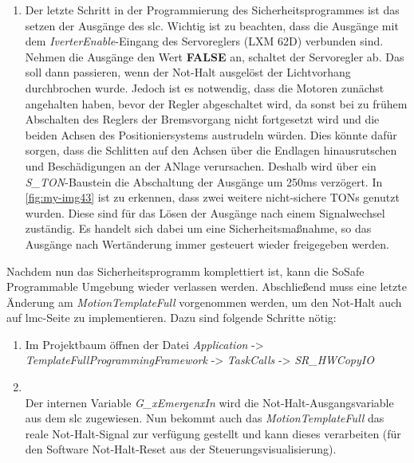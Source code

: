 \documentclass[../../../Bachelorarbeit.tex]{subfiles}
\begin{document}
\begin{enumerate}
    \item Der letzte Schritt in der Programmierung des Sicherheitsprogrammes ist das setzen der Ausgänge des \acs{slc}. Wichtig ist zu beachten, dass die Ausgänge mit dem \textit{IverterEnable}-Eingang des Servoreglers (LXM 62D) verbunden sind. Nehmen die Ausgänge den Wert \textbf{FALSE} an, schaltet der Servoregler ab. Das soll dann passieren, wenn der Not-Halt ausgelöst \bzw der Lichtvorhang durchbrochen wurde. Jedoch ist es notwendig, dass die Motoren zunächst angehalten haben, bevor der Regler abgeschaltet wird, da sonst bei zu frühem Abschalten des Reglers der Bremsvorgang nicht fortgesetzt wird und die beiden Achsen des Positioniersystems austrudeln würden. Dies könnte dafür sorgen, dass die Schlitten auf den Achsen über die Endlagen hinausrutschen und Beschädigungen an der ANlage verursachen. Deshalb wird über ein \textit{S\_TON}-Baustein die Abschaltung der Ausgänge um 250\si{ms} verzögert. In \autoref{fig:my-img43} ist zu erkennen, dass zwei weitere nicht-sichere TONs genutzt wurden. Diese sind für das Lösen der Ausgänge nach einem Signalwechsel zuständig. Es handelt sich dabei um eine Sicherheitsmaßnahme, so das Ausgänge nach Wertänderung immer gesteuert wieder freigegeben werden.
\end{enumerate}

Nachdem nun das Sicherheitsprogramm komplettiert ist, kann die SoSafe Programmable Umgebung wieder verlassen werden. Abschließend muss eine letzte Änderung am \textit{MotionTemplateFull} vorgenommen werden, um den Not-Halt auch auf \acs{lmc}-Seite zu implementieren. Dazu sind folgende Schritte nötig:

\begin{enumerate}
    \item Im Projektbaum öffnen der Datei \textit{Application} -> \textit{TemplateFullProgrammingFramework} -> \textit{TaskCalls} -> \textit{SR\_HWCopyIO}
    \item \begin{minipage}[t]{\linewidth}
        \raggedright
        \label{fig:my-img44}
    \end{minipage}
    \bigskip \\
    Der internen Variable \textit{G\_xEmergenxIn} wird die Not-Halt-Ausgangsvariable aus dem \acs{slc} zugewiesen. Nun bekommt auch das \textit{MotionTemplateFull} das reale Not-Halt-Signal zur verfügung gestellt und kann dieses verarbeiten (\zB für den Software Not-Halt-Reset aus der Steuerungsvisualisierung).
\end{enumerate}
\end{document}
